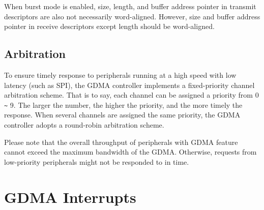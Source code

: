 \documentclass[main\_\_EN.tex]{subfiles}
\begin{document}
When burst mode is enabled, size, length, and buffer address pointer in transmit descriptors are also not necessarily word-aligned. However, size and buffer address pointer in receive descriptors except length should be word-aligned.

\subsection{Arbitration}

To ensure timely response to peripherals running at a high speed with low latency (such as SPI), the GDMA controller implements a fixed-priority channel arbitration scheme. That is to say, each channel can be assigned a priority from 0 \verb+~+ 9. The larger the number, the higher the priority, and the more timely the response. When several channels are assigned the same priority, the GDMA controller adopts a round-robin arbitration scheme.


Please note that the overall throughput of peripherals with GDMA feature cannot exceed the maximum bandwidth of the GDMA. Otherwise, requests from low-priority peripherals might not be responded to in time.


\section{GDMA Interrupts}
\end{document}
